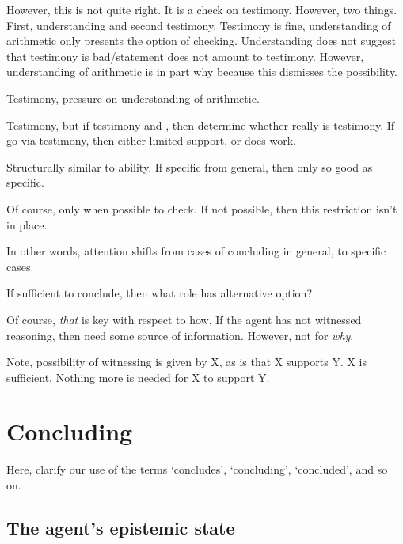 \begin{note}
  However, this is not quite right.
  It is a check on testimony.
  However, two things.
  First, understanding and second testimony.
  Testimony is fine, understanding of arithmetic only presents the option of checking.
  Understanding does not suggest that testimony is bad/statement does not amount to testimony.
  However, understanding of arithmetic is in part why because this dismisses the possibility.

  Testimony, pressure on understanding of arithmetic.

  Testimony, but if testimony and , then determine whether really is testimony.
  If go via testimony, then either limited support, or  does work.

  Structurally similar to ability.
  If specific from general, then only so good as specific.

  Of course, only when possible to check.
  If not possible, then this restriction isn't in place.

  In other words, attention shifts from cases of concluding in general, to specific cases.

  If sufficient to conclude, then what role has alternative option?
\end{note}

\begin{note}
  Of course, \emph{that}  is key with respect to how.
  If the agent has not witnessed reasoning, then need some source of information.
  However, not for \emph{why}.

  Note, possibility of witnessing is given by X, as is that X supports Y.
  X is sufficient.
  Nothing more is needed for X to support Y.
\end{note}



\section{Concluding}
\label{sec:ideas-1}

\begin{note}[Outline]
  Here, clarify our use of the terms `concludes', `concluding', `concluded', and so on.
\end{note}

\subsection{The agent's epistemic state}
\label{sec:agents-epist-state}

